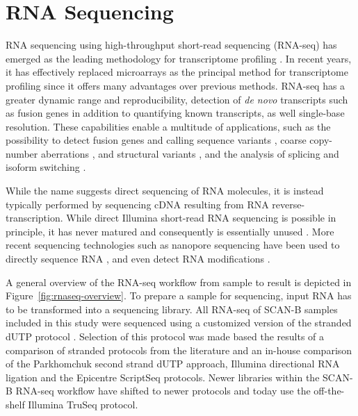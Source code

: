 \documentclass[11pt]{book}
\newcommand{\scanb}{\mbox{SCAN-B}}
\begin{document}
\section{RNA Sequencing}
\label{sec:rnaseq}

RNA sequencing using high-throughput short-read sequencing (RNA-seq) has emerged as the leading methodology for transcriptome profiling \cite{Wang:2009}. In recent years, it has effectively replaced microarrays as the principal method for transcriptome profiling since it offers many advantages over previous methods. RNA-seq has a greater dynamic range and reproducibility, detection of \textit{de novo} transcripts such as fusion genes in addition to quantifying known transcripts, as well single-base resolution. These capabilities enable a multitude of applications, such as the possibility to detect fusion genes and calling sequence variants \cite{Piskol:2013, Horvath:2013, Radenbaugh:2014, Wilkerson:2014, Guo:2017, Siegel:2018, Neums:2018}, coarse copy-number aberrations \cite{Patel:2014-RNA-CNA, Crowley:2015-RNA-CNA, Talevich:2018-cnvkitrna, Flensburg:2020}, and structural variants \cite{Ma:2018-Squid, Cmero:2020}, and the analysis of splicing and isoform switching \cite{Vitting-Seerup:2017}.

While the name suggests direct sequencing of RNA molecules, it is instead typically performed by sequencing cDNA resulting from RNA reverse-transcription. While direct Illumina short-read RNA sequencing is possible in principle, it has never matured and consequently is essentially unused \cite{Ozsolak:2009, Ozsolak:2011}. More recent sequencing technologies such as nanopore sequencing have been used to directly sequence RNA \cite{Geralde:2018, Soneson:2019, Hardwick:2019}, and even detect RNA modifications \cite{Leger:2019, Stephenson:2020}.

A general overview of the RNA-seq workflow from sample to result is depicted in Figure~\ref{fig:rnaseq-overview}. To prepare a sample for sequencing, input RNA has to be transformed into a sequencing library. All RNA-seq of SCAN-B samples included in this study were sequenced using a customized version of the stranded dUTP protocol \cite{Parkhomchuk:2009}. Selection of this protocol was made based the results of a comparison of stranded protocols from the literature \cite{Levin:2010} and an in-house comparison of the Parkhomchuk second strand dUTP approach, Illumina directional RNA ligation and the Epicentre ScriptSeq protocols. Newer libraries within the \scanb{} RNA-seq workflow have shifted to newer protocols and today use the off-the-shelf Illumina TruSeq protocol.
\end{document}

